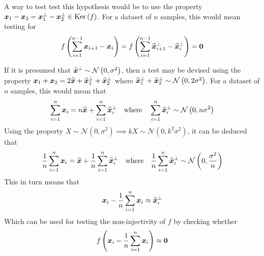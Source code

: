 A way to test test this hypothesis would be to use the property \( \bm{x}_1 - \bm{x}_2 = \bm{x}_1^\perp - \bm{x}_2^\perp \in \mathrm{Ker} \left( f \right) \). For a dataset of \( n \) samples, this would mean testing for
\[ f \left( \sum_{i = 1}^{n - 1} \bm{x}_{i + 1} - \bm{x}_i \right) = f \left( \sum_{i = 1}^{n - 1} \widehat{\bm{x}}_{i + 1}^\perp - \widehat{\bm{x}}_i^\perp \right) = \bm{0} \]

If it is presumed that \( \widehat{\bm{x}}^\perp \sim \mathcal{N} \left(0, \sigma^2 \right) \), then a test may be devised using the property \( \bm{x}_1 + \bm{x}_2 = 2 \widehat{\bm{x}} + \widehat{\bm{x}}_1^\perp + \widehat{\bm{x}}_2^\perp \) where \( \widehat{\bm{x}}_1^\perp + \widehat{\bm{x}}_2^\perp \sim \mathcal{N} \left( 0, 2 \sigma^2 \right) \). For a dataset of \( n \) samples, this would mean that
\[ \sum_{i = 1}^n \bm{x}_i = n \widehat{\bm{x}} + \sum_{i = 1}^n \widehat{\bm{x}}_i^\perp \quad \text{where} \quad \sum_{i = 1}^n \widehat{\bm{x}}_i^\perp \sim \mathcal{N} \left( 0, n \sigma^2 \right) \]
Using the property \( X \sim \mathcal{N} \left( 0, \sigma^2 \right) \implies kX \sim \mathcal{N} \left( 0, k^2 \sigma^2 \right) \), it can be deduced that
\[ \frac{1}{n}\sum_{i = 1}^n \bm{x}_i = \widehat{\bm{x}} + \frac{1}{n}\sum_{i = 1}^n \widehat{\bm{x}}_i^\perp \quad \text{where} \quad \frac{1}{n}\sum_{i = 1}^n \widehat{\bm{x}}_i^\perp \sim \mathcal{N} \left( 0, \frac{\sigma^2}{n} \right) \]
This in turn means that
\[ \bm{x}_i - \frac{1}{n}\sum_{i = 1}^n \bm{x}_i \approx \widehat{\bm{x}}_i^\perp \]
Which can be used for testing the non-injectivity of \( f \) by checking whether
\[ f \left( \bm{x}_i - \frac{1}{n}\sum_{i = 1}^n \bm{x}_i \right) \approx \bm{0} \]
